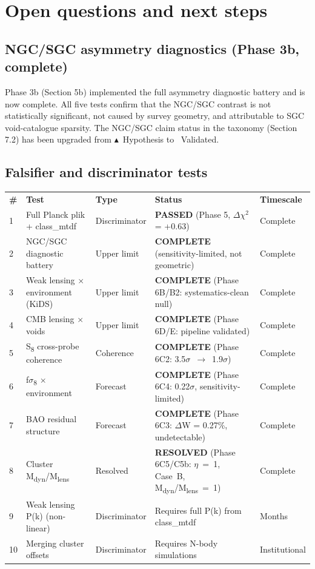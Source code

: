 \documentclass[11pt,a4paper]{article}
\begin{document}
\section{Open questions and next steps}
\label{sec:sec8}

\subsection{NGC/\allowbreak{}SGC asymmetry diagnostics (Phase 3b, complete)}
Phase 3b (Section 5b) implemented the full asymmetry diagnostic battery and is now complete. All five tests confirm that the NGC/\allowbreak{}SGC contrast is not statistically significant, not caused by survey geometry, and attributable to SGC void-catalogue sparsity. The NGC/\allowbreak{}SGC claim status in the taxonomy (Section 7.2) has been upgraded from $\blacktriangle$~Hypothesis to \checkmark{}~Validated.

\subsection{Falsifier and discriminator tests}
\begin{table}[H]
\centering
\footnotesize
\begin{tabularx}{\linewidth}{l>{\RaggedRight\arraybackslash}X>{\RaggedRight\arraybackslash}X>{\RaggedRight\arraybackslash}X>{\RaggedRight\arraybackslash}X}
\toprule
\textbf{\#} & \textbf{Test} & \textbf{Type} & \textbf{Status} & \textbf{Timescale} \tabularnewline
1 & Full Planck plik + class\_\allowbreak{}mtdf & Discriminator & \textbf{PASSED} (Phase 5, $\Delta$$\chi$$^{2}$ = +0.63) & Complete \tabularnewline
2 & NGC/\allowbreak{}SGC diagnostic battery & Upper limit & \textbf{COMPLETE} (sensitivity-limited, not geometric) & Complete \tabularnewline
3 & Weak lensing $\times$ environment (KiDS) & Upper limit & \textbf{COMPLETE} (Phase 6B/\allowbreak{}B2: systematics-clean null) & Complete \tabularnewline
4 & CMB lensing $\times$ voids & Upper limit & \textbf{COMPLETE} (Phase 6D/\allowbreak{}E: pipeline validated) & Complete \tabularnewline
5 & S\textsubscript{8} cross-probe coherence & Coherence & \textbf{COMPLETE} (Phase 6C2: 3.5$\sigma$~$\rightarrow$~1.9$\sigma$) & Complete \tabularnewline
6 & f$\sigma$\textsubscript{8} $\times$ environment & Forecast & \textbf{COMPLETE} (Phase 6C4: 0.22$\sigma$, sensitivity-limited) & Complete \tabularnewline
7 & BAO residual structure & Forecast & \textbf{COMPLETE} (Phase 6C3: $\Delta$W = 0.27\%, undetectable) & Complete \tabularnewline
8 & Cluster M\textsubscript{dyn}/M\textsubscript{lens} & Resolved & \textbf{RESOLVED} (Phase 6C5/\allowbreak{}C5b: $\eta$~=~1, Case~B, M\textsubscript{dyn}/M\textsubscript{lens}~=~1) & Complete \tabularnewline
9 & Weak lensing P(k) (non-linear) & Discriminator & Requires full P(k) from class\_\allowbreak{}mtdf & Months \tabularnewline
10 & Merging cluster offsets & Discriminator & Requires N-body simulations & Institutional \tabularnewline
\bottomrule
\end{tabularx}
\end{table}
\end{document}
